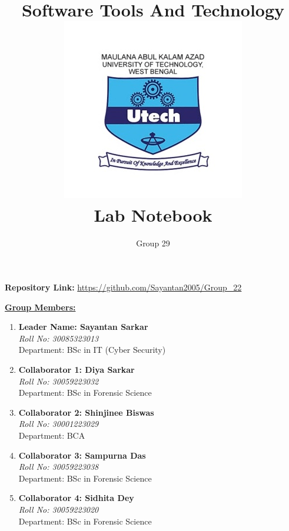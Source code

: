 \documentclass[12pt, a4paper]{article}
\title{
    \vspace{-2cm}
    \Huge \textbf{\color{blue!60} Software Tools And Technology}\\[0.5cm]
    \includegraphics[width=0.3\linewidth]{Makaut.png}\\[0.5cm]
    \LARGE \textbf{\color{black} Lab Notebook}
}
\author{
    \vspace{1cm}
    \Large Group 29
}
\date{} %
\begin{document}
\maketitle
{}


\vspace{-1cm}
\begin{center}
    \textbf{Repository Link:} \href{https://github.com/Sayantan2005/Group\_22}{\textcolor{blue!60}{https://github.com/Sayantan2005/Group\_22}}
\end{center}

\vspace{1cm}

\centering
\bfseries{\underline{\Large \textcolor{blue!60}{Group Members:}}}
\vspace{0.5cm}

\begin{flushleft}
\begin{enumerate}
    \item \textbf{Leader Name: Sayantan Sarkar}\\
    \textit{Roll No: 30085323013} \\
    Department: BSc in IT (Cyber Security)
    
    \item \textbf{Collaborator 1: Diya Sarkar} \\
    \textit{Roll No: 30059223032} \\
    Department: BSc in Forensic Science
    
    \item \textbf{Collaborator 2: Shinjinee Biswas} \\
    \textit{Roll No: 30001223029} \\
    Department: BCA
    
    \item \textbf{Collaborator 3: Sampurna Das} \\
    \textit{Roll No: 30059223038} \\
    Department: BSc in Forensic Science
    
    \item \textbf{Collaborator 4: Sidhita Dey} \\
    \textit{Roll No: 30059223020} \\
    Department: BSc in Forensic Science
\end{enumerate}
\end{flushleft}
\end{document}
